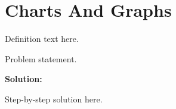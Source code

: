 \section{Charts And Graphs}


\begin{definition}[Term]
Definition text here.
\end{definition}

\begin{example}
Problem statement.

\textbf{Solution:}

Step-by-step solution here.
\end{example}
